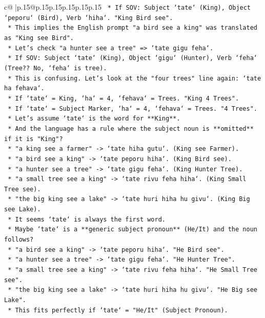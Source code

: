 \documentclass{article}
\begin{document}
{\begin{supertabular}{c@{$\;$}|p{.15\linewidth}@{}p{.15\linewidth}p{.15\linewidth}p{.15\linewidth}p{.15\linewidth}p{.15\linewidth}}
{{{\texttt{    *   If SOV: Subject `tate` (King), Object `peporu` (Bird), Verb `hiha`. "King Bird see".} \\
\texttt{    *   This implies the English prompt "a bird see a king" was translated as "King see Bird".} \\
\texttt{    *   Let's check "a hunter see a tree" => `tate gigu feha`.} \\
\texttt{    *   If SOV: Subject `tate` (King), Object `gigu` (Hunter), Verb `feha` (Tree?? No, `feha` is tree).} \\
\texttt{    *   This is confusing. Let's look at the "four trees" line again: `tate ha fehava`.} \\
\texttt{    *   If `tate` = King, `ha` = 4, `fehava` = Trees. "King 4 Trees".} \\
\texttt{    *   If `tate` = Subject Marker, `ha` = 4, `fehava` = Trees. "4 Trees".} \\
\texttt{    *   Let's assume `tate` is the word for **King**.} \\
\texttt{    *   And the language has a rule where the subject noun is **omitted** if it is "King"?} \\
\texttt{    *   "a king see a farmer" {-}> `tate hiha gutu`. (King see Farmer).} \\
\texttt{    *   "a bird see a king" {-}> `tate peporu hiha`. (King Bird see).} \\
\texttt{    *   "a hunter see a tree" {-}> `tate gigu feha`. (King Hunter Tree).} \\
\texttt{    *   "a small tree see a king" {-}> `tate rivu feha hiha`. (King Small Tree see).} \\
\texttt{    *   "the big king see a lake" {-}> `tate huri hiha hu givu`. (King Big see Lake).} \\
\texttt{    *   It seems `tate` is always the first word.} \\
\texttt{    *   Maybe `tate` is a **generic subject pronoun** (He/It) and the noun follows?} \\
\texttt{    *   "a bird see a king" {-}> `tate peporu hiha`. "He Bird see".} \\
\texttt{    *   "a hunter see a tree" {-}> `tate gigu feha`. "He Hunter Tree".} \\
\texttt{    *   "a small tree see a king" {-}> `tate rivu feha hiha`. "He Small Tree see".} \\
\texttt{    *   "the big king see a lake" {-}> `tate huri hiha hu givu`. "He Big see Lake".} \\
\texttt{    *   This fits perfectly if `tate` = "He/It" (Subject Pronoun).} \\
}}}
\end{supertabular}}
\end{document}
